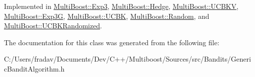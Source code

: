 Implemented in \hyperlink{classMultiBoost_1_1Exp3_a2dc6188c0ede884c85d4d9c0354f29fa}{Multi\-Boost\-::\-Exp3}, \hyperlink{classMultiBoost_1_1Hedge_a49a9fa2dc295c11be60d43e3a6a102e7}{Multi\-Boost\-::\-Hedge}, \hyperlink{classMultiBoost_1_1UCBKV_a4dca42657cf26182b60ecdf635c01b49}{Multi\-Boost\-::\-U\-C\-B\-K\-V}, \hyperlink{classMultiBoost_1_1Exp3G_a5ba701c52290894791ff2fcc685df3a3}{Multi\-Boost\-::\-Exp3\-G}, \hyperlink{classMultiBoost_1_1UCBK_a56d9c14616eaa82858b504603bcd077a}{Multi\-Boost\-::\-U\-C\-B\-K}, \hyperlink{classMultiBoost_1_1Random_a8dbf16884f29168fa9cb3feede07bd4e}{Multi\-Boost\-::\-Random}, and \hyperlink{classMultiBoost_1_1UCBKRandomized_ae13fd9d7f2abe28a3f1e6aa8ff76c1ef}{Multi\-Boost\-::\-U\-C\-B\-K\-Randomized}.



The documentation for this class was generated from the following file\-:\begin{DoxyCompactItemize}
\item 
C\-:/\-Users/fradav/\-Documents/\-Dev/\-C++/\-Multiboost/\-Sources/src/\-Bandits/Generic\-Bandit\-Algorithm.\-h\end{DoxyCompactItemize}
